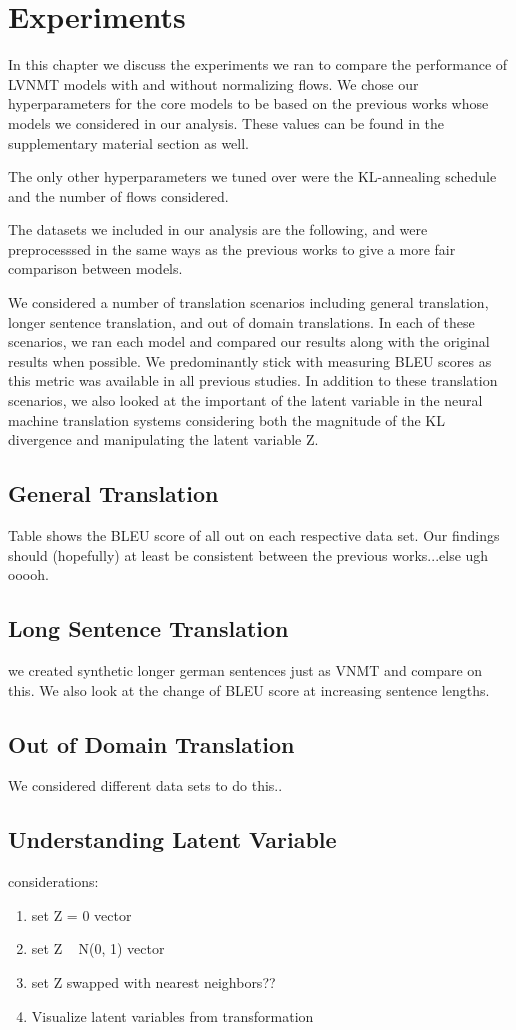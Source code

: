 \chapter{Experiments}

In this chapter we discuss the experiments we ran to compare the performance of \ac{LVNMT} models with and without normalizing flows. We chose our hyperparameters for the core models to be based on the previous works whose models we considered in our analysis. These values can be found in the supplementary material section as well. 

The only other hyperparameters we tuned over were the KL-annealing schedule and the number of flows considered. 

The datasets we included in our analysis are the following, and were preprocesssed in the same ways as the previous works to give a more fair comparison between models. 


We considered a number of translation scenarios including general translation, longer sentence translation, and out of domain translations. In each of these scenarios, we ran each model and compared our results along with the original results when possible. We predominantly stick with measuring BLEU scores as this metric was available in all previous studies. In addition to these translation scenarios, we also looked at the important of the latent variable in the neural machine translation systems considering both the magnitude of the KL divergence and manipulating the latent variable Z. 

\section{General Translation}

Table \reminder{\#} shows the BLEU score of all out on each respective data set. Our findings should (hopefully) at least be consistent between the previous works...else ugh ooooh.

\section{Long Sentence Translation}

we created synthetic longer german sentences just as VNMT and compare on this. We also look at the change of BLEU score at increasing sentence lengths.

\section{Out of Domain Translation}

We considered different data sets to do this..

\section{Understanding Latent Variable}

considerations:
\begin{enumerate}
	\item set Z = 0 vector
	\item set Z ~ N(0, 1) vector
	\item set Z swapped with nearest neighbors??
	\item Visualize latent variables from transformation
\end{enumerate}